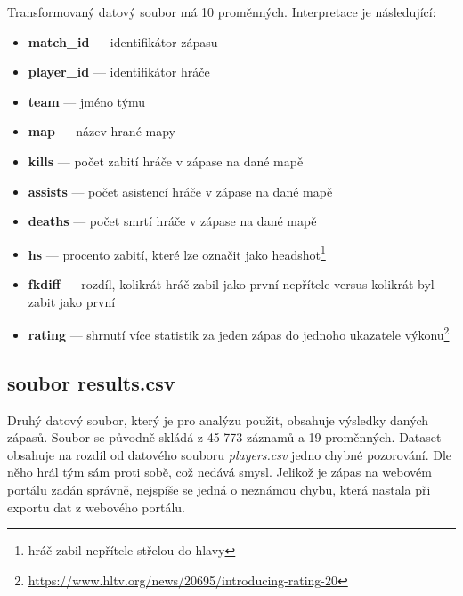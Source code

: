 \newpage
Transformovaný 
{\color{red}
datový soubor
}
má 10 proměnných. Interpretace je následující:
\begin{itemize}
    \item \textbf{match\_id} --- identifikátor zápasu
    \item \textbf{player\_id} --- identifikátor hráče
    \item \textbf{team} --- jméno týmu
    \item \textbf{map} --- název hrané mapy
    \item \textbf{kills} --- počet zabití hráče v zápase na dané mapě
    \item \textbf{assists} --- počet asistencí hráče v zápase na dané mapě
    \item \textbf{deaths} --- počet smrtí hráče v zápase na dané mapě
    \item \textbf{hs} --- procento zabití, které lze označit jako headshot\footnote{hráč zabil nepřítele střelou do hlavy}
    \item \textbf{fkdiff} --- rozdíl, kolikrát hráč zabil jako první nepřítele versus kolikrát byl zabit jako první
    \item \textbf{rating} --- shrnutí více statistik za jeden zápas do jednoho ukazatele výkonu\footnote{\url{https://www.hltv.org/news/20695/introducing-rating-20}}
\end{itemize}

\subsection{soubor results.csv}
Druhý datový soubor, který je pro analýzu použit, obsahuje výsledky daných zápasů. Soubor se původně skládá z 45 773 záznamů a 19 proměnných. Dataset obsahuje na rozdíl
od datového souboru \textit{players.csv} jedno chybné pozorování. Dle něho hrál tým sám proti sobě, což nedává smysl. Jelikož je zápas na webovém portálu zadán
správně, nejspíše se jedná o neznámou chybu, která nastala při exportu dat z webového portálu.

